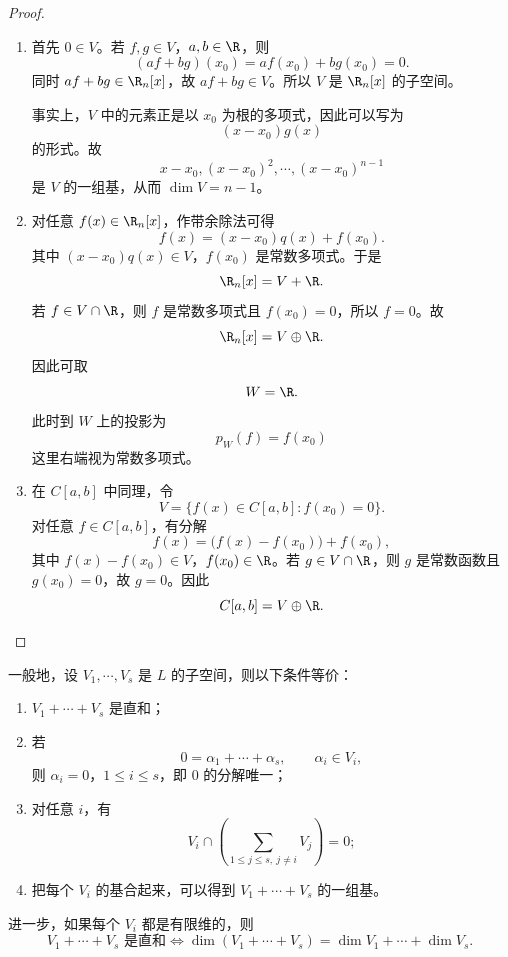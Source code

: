 \begin{proof}
	\begin{enumerate}
		\item 首先 $0\in V$。若 $f,g\in V$，$a,b\in\R$，则
		\[
		(af+bg)(x_0)=af(x_0)+bg(x_0)=0.
		\]
		同时 $af+bg\in\R_n[x]$，故 $af+bg\in V$。所以 $V$ 是 $\R_n[x]$ 的子空间。
		
		事实上，$V$ 中的元素正是以 $x_0$ 为根的多项式，因此可以写为
		\[
		(x-x_0)g(x)
		\]
		的形式。故
		\[
		x-x_0,(x-x_0)^2,\cdots,(x-x_0)^{n-1}
		\]
		是 $V$ 的一组基，从而 $\dim V=n-1$。
		
		\item 对任意 $f(x)\in\R_n[x]$，作带余除法可得
		\[
		f(x)=(x-x_0)q(x)+f(x_0).
		\]
		其中 $(x-x_0)q(x)\in V$，$f(x_0)$ 是常数多项式。于是
		\[
		\R_n[x]=V+\R.
		\]
		若 $f\in V\cap\R$，则 $f$ 是常数多项式且 $f(x_0)=0$，所以 $f=0$。故
		\[
		\R_n[x]=V\oplus\R.
		\]
		因此可取
		\[
		W=\R.
		\]
		此时到 $W$ 上的投影为
		\[
		p_W(f)=f(x_0)
		\]
		这里右端视为常数多项式。
		
		\item 在 $C[a,b]$ 中同理，令
		\[
		V=\{f(x)\in C[a,b]:f(x_0)=0\}.
		\]
		对任意 $f\in C[a,b]$，有分解
		\[
		f(x)=\bigl(f(x)-f(x_0)\bigr)+f(x_0),
		\]
		其中 $f(x)-f(x_0)\in V$，$f(x_0)\in\R$。若 $g\in V\cap\R$，则 $g$ 是常数函数且 $g(x_0)=0$，故 $g=0$。因此
		\[
		C[a,b]=V\oplus\R.
		\]
	\end{enumerate}
\end{proof}
\begin{proposition}
		一般地，设 $V_1,\cdots,V_s$ 是 $L$ 的子空间，则以下条件等价：
	\begin{enumerate}
		\item $V_1+\cdots+V_s$ 是直和；
		\item 若
		\[
		0=\alpha_1+\cdots+\alpha_s,
		\qquad \alpha_i\in V_i,
		\]
		则 $\alpha_i=0$，$1\leq i\leq s$，即 $0$ 的分解唯一；
		\item 对任意 $i$，有
		\[
		V_i\cap\left(\sum_{1\leq j\leq s,\ j\neq i}V_j\right)=0;
		\]
		\item 把每个 $V_i$ 的基合起来，可以得到 $V_1+\cdots+V_s$ 的一组基。
	\end{enumerate}
	进一步，如果每个 $V_i$ 都是有限维的，则
	\[
	V_1+\cdots+V_s\text{ 是直和}
	\Longleftrightarrow
	\dim(V_1+
	\cdots+V_s)=\dim V_1+
	\cdots+
	\dim V_s.
	\]
\end{proposition}


